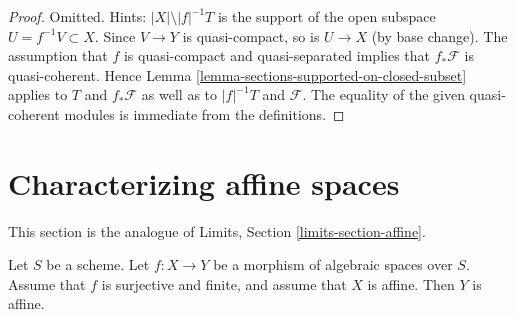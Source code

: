 \begin{proof}
Omitted. Hints: $|X| \setminus |f|^{-1}T$ is the support of the open subspace
$U = f^{-1}V \subset X$. Since $V \to Y$ is quasi-compact, so is
$U \to X$ (by base change). The assumption that $f$ is quasi-compact and
quasi-separated implies that $f_*\mathcal{F}$ is quasi-coherent.
Hence Lemma \ref{lemma-sections-supported-on-closed-subset}
applies to $T$ and $f_*\mathcal{F}$ as well as to
$|f|^{-1}T$ and $\mathcal{F}$. The equality of the given quasi-coherent
modules is immediate from the definitions.
\end{proof}















\section{Characterizing affine spaces}
\label{section-affine}

\noindent
This section is the analogue of Limits, Section \ref{limits-section-affine}.

\begin{lemma}
\label{lemma-affine}
Let $S$ be a scheme. Let $f : X \to Y$ be a morphism of algebraic spaces
over $S$. Assume that $f$ is surjective and finite, and assume that $X$
is affine. Then $Y$ is affine.
\end{lemma}

